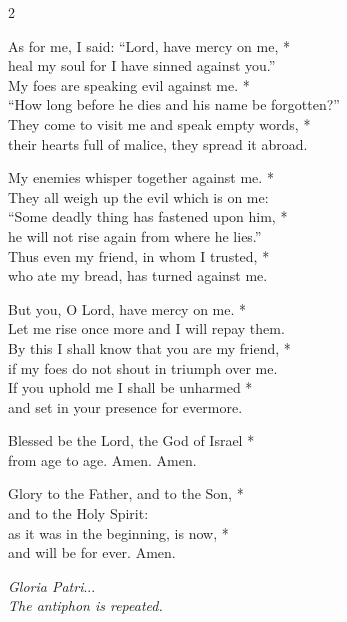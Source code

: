 \begin{multicols}{2}

    
    As for me, I said: “Lord, have mercy on me, *\\
    heal my soul for I have sinned against you.”\\
    My foes are speaking evil against me. *\\
    “How long before he dies and his name be forgotten?”\\
    They come to visit me and speak empty words, *\\
    their hearts full of malice, they spread it abroad.
    
    My enemies whisper together against me. *\\
    They all weigh up the evil which is on me:\\
    “Some deadly thing has fastened upon him, *\\
    he will not rise again from where he lies.”\\
    Thus even my friend, in whom I trusted, *\\
    who ate my bread, has turned against me.
    
    But you, O Lord, have mercy on me. *\\
    Let me rise once more and I will repay them.\\
    By this I shall know that you are my friend, *\\
    if my foes do not shout in triumph over me.\\
    If you uphold me I shall be unharmed *\\
    and set in your presence for evermore.
    
    Blessed be the Lord, the God of Israel *\\
    from age to age. Amen. Amen.
    
    Glory to the Father, and to the Son, *\\
    and to the Holy Spirit:\\
    as it was in the beginning, is now, *\\
    and will be for ever. Amen.

    \emph{Gloria Patri}...\\
    \emph{The antiphon is repeated.}
\end{multicols}
